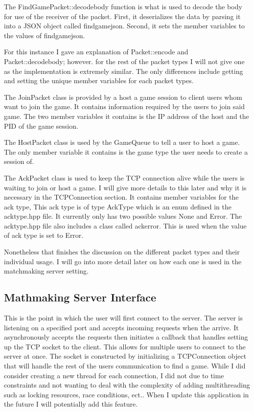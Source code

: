 \documentclass[conference]{IEEEtran}
\begin{document}
The  FindGamePacket::decode\textunderscore body function is what is used to decode the body for use of the receiver of the packet.
First, it deserializes the data by parsing it into a JSON object called find\textunderscore game\textunderscore json.
Second, it sets the member variables to the values of find\textunderscore game\textunderscore json.

For this instance I gave an explanation of Packet::encode and Packet::decode\textunderscore body; however. for the rest of the packet types I will not give one as the implementation is extremely similar.
The only differences include getting and setting the unique member variables for each packet types.


The JoinPacket class is provided by a host a game session to client users whom want to join the game. 
It contains information required by the users to join said game.
The two member variables it contains is the IP address of the host and the PID of the game session.

The HostPacket class is used by the GameQueue to tell a user to host a game.
The only member variable it contains is the game type the user needs to create a session of.

The AckPacket class is used to keep the TCP connection alive while the users is waiting to join or host a game.
I will give more details to this later and why it is necessary in the TCPConnection section.
It contains member variables for the ack type,
This ack type is of type AckType which is an enum defined in the ack\textunderscore type.hpp file.
It currently only has two possible values None and Error.
The ack\textunderscore type.hpp file also includes a class called ack\textunderscore error.
This is used when the value of ack type is set to Error.

Nonetheless that finishes the discussion on the different packet types and their individual usage.
I will go into more detail later on how each one is used in the matchmaking server setting.


\subsection{Mathmaking Server Interface}
This is the point in which the user will first connect to the server.
The server is listening on a specified port and accepts incoming requests when the arrive. 
It asynchronously accepts the requests then initiates a callback that handles setting up the TCP socket to the client.
This allows for multiple users to connect to the server at once. 
The socket is constructed by initializing a TCPConnection object that will handle the rest of the users communication to find a game.
While I did consider creating a new thread for each connection, I did not due to time constraints and not wanting to deal with the complexity of adding multithreading such as locking resources, race conditions, ect..
When I update this application in the future I will potentially add this feature.
\end{document}
